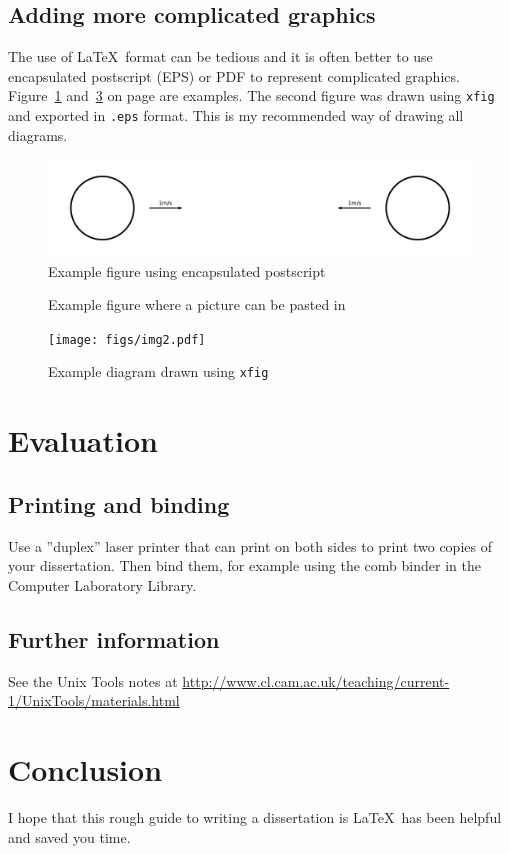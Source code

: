 \documentclass[12pt,a4paper,twoside,openright]{report}
\begin{document}
\section{Adding more complicated graphics}
The use of \LaTeX\ format can be tedious and it is often better to use
encapsulated postscript (EPS) or PDF to represent complicated graphics.
Figure~\ref{epsfig} and~\ref{xfig} on page \pageref{xfig} are
examples. The second figure was drawn using \texttt{xfig} and exported in
{\tt.eps} format. This is my recommended way of drawing all diagrams.
\begin{figure}[tbh]
\centerline{\includegraphics{figs/img1.png}}
\caption{Example figure using encapsulated postscript}
\label{epsfig}
\end{figure}
\begin{figure}[tbh]
\vspace{4in}
\caption{Example figure where a picture can be pasted in}
\label{pastedfig}
\end{figure}
\begin{figure}[tbh]
\centerline{\texttt{[image: figs/img2.pdf]}}
\caption{Example diagram drawn using \texttt{xfig}}
\label{xfig}
\end{figure}
\chapter{Evaluation}
\section{Printing and binding}
Use a ''duplex'' laser printer that can print on both sides to print
two copies of your dissertation. Then bind them, for example using the
comb binder in the Computer Laboratory Library.
\section{Further information}
See the Unix Tools notes at
\url{http://www.cl.cam.ac.uk/teaching/current-1/UnixTools/materials.html}
\chapter{Conclusion}
I hope that this rough guide to writing a dissertation is \LaTeX\ has
been helpful and saved you time.

\appendix
\end{document}
